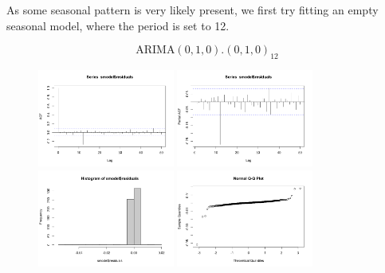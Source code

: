 \documentclass[a4paper,11pt]{article}
\begin{document}
    As some seasonal pattern is very likely present, we first try fitting an empty seasonal model, where the period is set to 12.

    \[\text{ARIMA}(0,1,0).(0,1,0)_{12}\]

    \begin{figure}[H]
        \centering
        \includegraphics[width=0.4\textwidth]{ha-1_files/figure-markdown_strict/unnamed-chunk-3-1.png}
        \includegraphics[width=0.4\textwidth]{ha-1_files/figure-markdown_strict/unnamed-chunk-3-2.png}
        \includegraphics[width=0.4\textwidth]{ha-1_files/figure-markdown_strict/unnamed-chunk-3-3.png}
        \includegraphics[width=0.4\textwidth]{ha-1_files/figure-markdown_strict/unnamed-chunk-3-4.png}
        \label{fig:f5}
    \end{figure}
\end{document}
